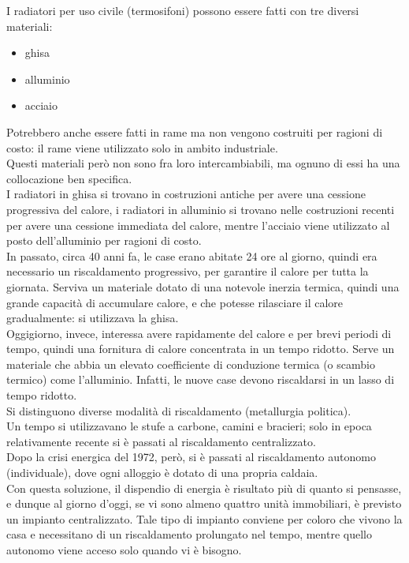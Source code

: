 I radiatori per uso civile (termosifoni) possono essere fatti con tre diversi materiali:
\begin{itemize}
    \item ghisa
    \item alluminio
    \item acciaio
\end{itemize}
Potrebbero anche essere fatti in rame ma non vengono costruiti per ragioni di costo: il rame viene utilizzato solo in ambito industriale.\\
Questi materiali però non sono fra loro intercambiabili, ma ognuno di essi ha una collocazione ben specifica.\\
I radiatori in ghisa si trovano in costruzioni antiche per avere una cessione progressiva del calore, i radiatori in alluminio si trovano nelle costruzioni recenti per avere una cessione immediata del calore, mentre l’acciaio viene utilizzato al posto dell’alluminio per ragioni di costo.\\
In passato, circa 40 anni fa, le case erano abitate 24 ore al giorno, quindi era necessario un riscaldamento progressivo, per garantire il calore per tutta la giornata. Serviva un materiale dotato di una notevole inerzia termica, quindi una grande capacità di accumulare calore, e che potesse rilasciare il calore gradualmente: si utilizzava la ghisa.\\
Oggigiorno, invece, interessa avere rapidamente del calore e per brevi periodi di tempo, quindi una fornitura di calore concentrata in un tempo ridotto. Serve un materiale che abbia un elevato coefficiente di conduzione termica (o scambio termico) come l’alluminio. Infatti, le nuove case devono riscaldarsi in un lasso di tempo ridotto.\\
Si distinguono diverse modalità di riscaldamento (metallurgia politica).\\
Un tempo si utilizzavano le stufe a carbone, camini e bracieri; solo in epoca relativamente recente si è passati al riscaldamento centralizzato.\\
Dopo la crisi energica del 1972, però, si è passati al riscaldamento autonomo (individuale), dove ogni alloggio è dotato di una propria caldaia.\\
Con questa soluzione, il dispendio di energia è risultato più di quanto si pensasse, e dunque al giorno d’oggi, se vi sono almeno quattro unità immobiliari, è previsto un impianto centralizzato. Tale tipo di impianto conviene per coloro che vivono la casa e necessitano di un riscaldamento prolungato nel tempo, mentre quello autonomo viene acceso solo quando vi è bisogno.\\
